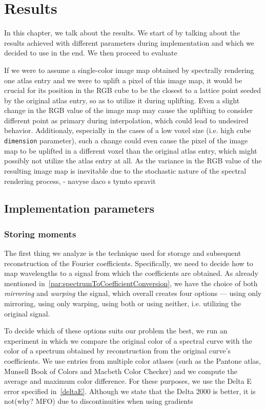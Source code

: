 \chapter{Results} \label{chap:results}

In this chapter, we talk about the results. We start of by talking about the results achieved with different parameters during implementation and which we decided to use in the end. We then proceed to evaluate

If we were to assume a single-color image map obtained by spectrally rendering one atlas entry and we were to uplift a pixel of this image map, it would be crucial for its position in the RGB cube to be the closest to a lattice point seeded by the original atlas entry, so as to utilize it during uplifting. Even a slight change in the RGB value of the image map may cause the uplifting to consider different point as primary during interpolation, which could lead to undesired behavior. Additionaly, especially in the cases of a low voxel size (i.e. high cube \texttt{dimension} parameter), such a change could even cause the pixel of the image map to be uplifted in a different voxel than the original atlas entry, which might possibly not utilize the atlas entry at all. As the variance in the RGB value of the resulting image map is inevitable due to the stochastic nature of the spectral rendering process, - navyse daco s tymto spravit

\section{Implementation parameters}

\subsection{Storing moments} \label{sec:storingMoments}

The first thing we analyze is the technique used for storage and subsequent reconstruction of the Fourier coefficients. Specifically, we need to decide how to map wavelengths to a signal from which the coefficients are obtained. As already mentioned in~\cref{par:spectrumToCoefficientConversion}, we have the choice of both \emph{mirroring} and \emph{warping} the signal, which overall creates four options --- using only mirroring, using only warping, using both or using neither, i.e. utilizing the original signal.

To decide which of these options suits our problem the best, we run an experiment in which we compare the original color of a spectral curve with the color of a spectrum obtained by reconstruction from the original curve's coefficients. We use entries from multiple color atlases (such as the Pantone atlas, Munsell Book of Colors and Macbeth Color Checker) and we compute the average and maximum color difference. For these purposes, we use the Delta E error specified in~\cref{deltaE}. Although we state that the Delta 2000 is better, it is not(why? MFO) due to  discontinuities when using gradients

